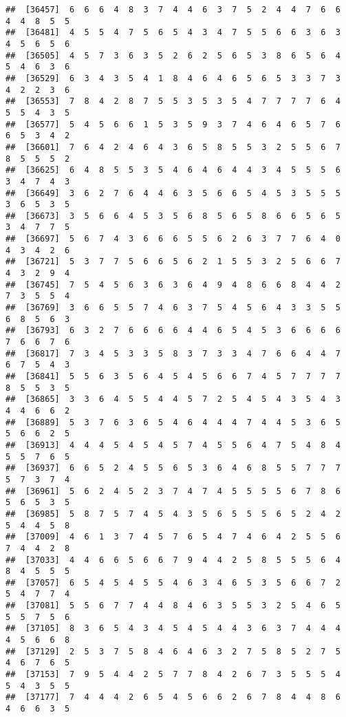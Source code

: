 \documentclass[
]{book}
\begin{document}
\begin{verbatim}
##  [36457]  6  6  6  4  8  3  7  4  4  6  3  7  5  2  4  4  7  6  6  4  4  8  5  5
##  [36481]  4  5  5  4  7  5  6  5  4  3  4  7  5  5  6  6  3  6  3  4  5  6  5  6
##  [36505]  4  5  7  3  6  3  5  2  6  2  5  6  5  3  8  6  5  6  4  5  4  6  3  6
##  [36529]  6  3  4  3  5  4  1  8  4  6  4  6  5  6  5  3  3  7  3  4  2  2  3  6
##  [36553]  7  8  4  2  8  7  5  5  3  5  3  5  4  7  7  7  7  6  4  5  5  4  3  5
##  [36577]  5  4  5  6  6  1  5  3  5  9  3  7  4  6  4  6  5  7  6  6  5  3  4  2
##  [36601]  7  6  4  2  4  6  4  3  6  5  8  5  5  3  2  5  5  6  7  8  5  5  5  2
##  [36625]  6  4  8  5  5  3  5  4  6  4  6  4  4  3  4  5  5  5  6  3  4  7  4  3
##  [36649]  3  6  2  7  6  4  4  6  3  5  6  6  5  4  5  3  5  5  5  3  6  5  3  5
##  [36673]  3  5  6  6  4  5  3  5  6  8  5  6  5  8  6  6  5  6  5  3  4  7  7  5
##  [36697]  5  6  7  4  3  6  6  6  5  5  6  2  6  3  7  7  6  4  0  4  3  4  2  6
##  [36721]  5  3  7  7  5  6  6  5  6  2  1  5  5  3  2  5  6  6  7  4  3  2  9  4
##  [36745]  7  5  4  5  6  3  6  3  6  4  9  4  8  6  6  8  4  4  2  7  3  5  5  4
##  [36769]  3  6  6  5  5  7  4  6  3  7  5  4  5  6  4  3  3  5  5  6  8  5  6  3
##  [36793]  6  3  2  7  6  6  6  6  4  4  6  5  4  5  3  6  6  6  6  7  6  6  7  6
##  [36817]  7  3  4  5  3  3  5  8  3  7  3  3  4  7  6  6  4  4  7  6  7  5  4  3
##  [36841]  5  5  6  3  5  6  4  5  4  5  6  6  7  4  5  7  7  7  7  8  5  5  3  5
##  [36865]  3  3  6  4  5  5  4  4  5  7  2  5  4  5  4  3  5  4  3  4  4  6  6  2
##  [36889]  5  3  7  6  3  6  5  4  6  4  4  4  7  4  4  5  3  6  5  5  6  6  2  5
##  [36913]  4  4  4  5  4  5  4  5  7  4  5  5  6  4  7  5  4  8  4  5  5  7  6  5
##  [36937]  6  6  5  2  4  5  5  6  5  3  6  4  6  8  5  5  7  7  7  5  7  3  7  4
##  [36961]  5  6  2  4  5  2  3  7  4  7  4  5  5  5  5  6  7  8  6  5  6  5  3  5
##  [36985]  5  8  7  5  7  4  5  4  3  5  6  5  5  5  6  5  2  4  2  5  4  4  5  8
##  [37009]  4  6  1  3  7  4  5  7  6  5  4  7  4  6  4  2  5  5  6  7  4  4  2  8
##  [37033]  4  4  6  6  5  6  6  7  9  4  4  2  5  8  5  5  5  6  4  8  4  5  5  5
##  [37057]  6  5  4  5  4  5  5  4  6  3  4  6  5  3  5  6  6  7  2  5  4  7  7  4
##  [37081]  5  5  6  7  7  4  4  8  4  6  3  5  5  3  2  5  4  6  5  5  5  7  5  6
##  [37105]  8  3  6  5  4  3  4  5  4  5  4  4  3  6  3  7  4  4  4  4  5  6  6  8
##  [37129]  2  5  3  7  5  8  4  6  4  6  3  2  7  5  8  5  2  7  5  4  6  7  6  5
##  [37153]  7  9  5  4  4  2  5  7  7  8  4  2  6  7  3  5  5  5  4  5  4  3  5  5
##  [37177]  7  4  4  4  2  6  5  4  5  6  6  2  6  7  8  4  4  8  6  4  6  6  3  5

\end{verbatim}
\end{document}
